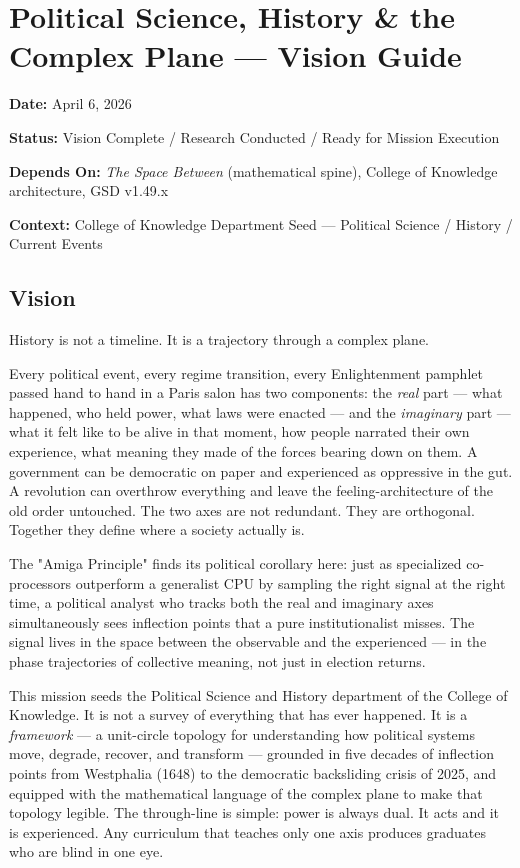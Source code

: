 \documentclass[11pt,letterpaper]{article}
\newcommand{\metafield}[2]{\textbf{\sffamily #1} #2\par}
\begin{document}
\section{Political Science, History \& the Complex Plane --- Vision Guide}

\metafield{Date:}{April 6, 2026}
\metafield{Status:}{Vision Complete / Research Conducted / Ready for Mission Execution}
\metafield{Depends On:}{\textit{The Space Between} (mathematical spine), College of Knowledge architecture, GSD v1.49.x}
\metafield{Context:}{College of Knowledge Department Seed --- Political Science / History / Current Events}

\subsection{Vision}

History is not a timeline. It is a trajectory through a complex plane.

Every political event, every regime transition, every Enlightenment pamphlet passed hand to hand in a Paris salon has two components: the \textit{real} part --- what happened, who held power, what laws were enacted --- and the \textit{imaginary} part --- what it felt like to be alive in that moment, how people narrated their own experience, what meaning they made of the forces bearing down on them. A government can be democratic on paper and experienced as oppressive in the gut. A revolution can overthrow everything and leave the feeling-architecture of the old order untouched. The two axes are not redundant. They are orthogonal. Together they define where a society actually is.

The "Amiga Principle" finds its political corollary here: just as specialized co-processors outperform a generalist CPU by sampling the right signal at the right time, a political analyst who tracks both the real and imaginary axes simultaneously sees inflection points that a pure institutionalist misses. The signal lives in the space between the observable and the experienced --- in the phase trajectories of collective meaning, not just in election returns.

This mission seeds the Political Science and History department of the College of Knowledge. It is not a survey of everything that has ever happened. It is a \textit{framework} --- a unit-circle topology for understanding how political systems move, degrade, recover, and transform --- grounded in five decades of inflection points from Westphalia (1648) to the democratic backsliding crisis of 2025, and equipped with the mathematical language of the complex plane to make that topology legible. The through-line is simple: power is always dual. It acts and it is experienced. Any curriculum that teaches only one axis produces graduates who are blind in one eye.
\end{document}
